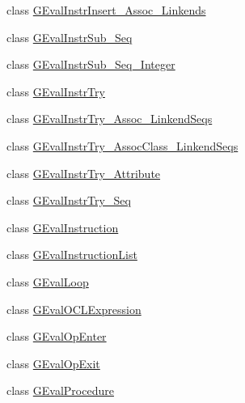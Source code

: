 \begin{DoxyCompactItemize}
\item 
class \hyperlink{classorg_1_1tzi_1_1use_1_1gen_1_1assl_1_1dynamics_1_1_g_eval_instr_insert___assoc___linkends}{G\-Eval\-Instr\-Insert\-\_\-\-Assoc\-\_\-\-Linkends}
\item 
class \hyperlink{classorg_1_1tzi_1_1use_1_1gen_1_1assl_1_1dynamics_1_1_g_eval_instr_sub___seq}{G\-Eval\-Instr\-Sub\-\_\-\-Seq}
\item 
class \hyperlink{classorg_1_1tzi_1_1use_1_1gen_1_1assl_1_1dynamics_1_1_g_eval_instr_sub___seq___integer}{G\-Eval\-Instr\-Sub\-\_\-\-Seq\-\_\-\-Integer}
\item 
class \hyperlink{classorg_1_1tzi_1_1use_1_1gen_1_1assl_1_1dynamics_1_1_g_eval_instr_try}{G\-Eval\-Instr\-Try}
\item 
class \hyperlink{classorg_1_1tzi_1_1use_1_1gen_1_1assl_1_1dynamics_1_1_g_eval_instr_try___assoc___linkend_seqs}{G\-Eval\-Instr\-Try\-\_\-\-Assoc\-\_\-\-Linkend\-Seqs}
\item 
class \hyperlink{classorg_1_1tzi_1_1use_1_1gen_1_1assl_1_1dynamics_1_1_g_eval_instr_try___assoc_class___linkend_seqs}{G\-Eval\-Instr\-Try\-\_\-\-Assoc\-Class\-\_\-\-Linkend\-Seqs}
\item 
class \hyperlink{classorg_1_1tzi_1_1use_1_1gen_1_1assl_1_1dynamics_1_1_g_eval_instr_try___attribute}{G\-Eval\-Instr\-Try\-\_\-\-Attribute}
\item 
class \hyperlink{classorg_1_1tzi_1_1use_1_1gen_1_1assl_1_1dynamics_1_1_g_eval_instr_try___seq}{G\-Eval\-Instr\-Try\-\_\-\-Seq}
\item 
class \hyperlink{classorg_1_1tzi_1_1use_1_1gen_1_1assl_1_1dynamics_1_1_g_eval_instruction}{G\-Eval\-Instruction}
\item 
class \hyperlink{classorg_1_1tzi_1_1use_1_1gen_1_1assl_1_1dynamics_1_1_g_eval_instruction_list}{G\-Eval\-Instruction\-List}
\item 
class \hyperlink{classorg_1_1tzi_1_1use_1_1gen_1_1assl_1_1dynamics_1_1_g_eval_loop}{G\-Eval\-Loop}
\item 
class \hyperlink{classorg_1_1tzi_1_1use_1_1gen_1_1assl_1_1dynamics_1_1_g_eval_o_c_l_expression}{G\-Eval\-O\-C\-L\-Expression}
\item 
class \hyperlink{classorg_1_1tzi_1_1use_1_1gen_1_1assl_1_1dynamics_1_1_g_eval_op_enter}{G\-Eval\-Op\-Enter}
\item 
class \hyperlink{classorg_1_1tzi_1_1use_1_1gen_1_1assl_1_1dynamics_1_1_g_eval_op_exit}{G\-Eval\-Op\-Exit}
\item 
class \hyperlink{classorg_1_1tzi_1_1use_1_1gen_1_1assl_1_1dynamics_1_1_g_eval_procedure}{G\-Eval\-Procedure}

\end{DoxyCompactItemize}
